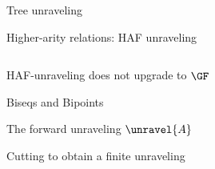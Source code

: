 \documentclass[aspectratio=169]{beamer}
\begin{document}

\begin{frame}{Tree unraveling}
  \begin{center}
    
  \end{center}
\end{frame}


\begin{frame}{Higher-arity relations: HAF unraveling}
  
  

  \begin{columns}
    \begin{column}{0.2\textwidth}
      \begin{overprint}


      \end{overprint}
    \end{column}
    \begin{column}{0.75\textwidth}
      \begin{overprint}
        \exunravelstruct{}


        \exunravelhat{}
      \end{overprint}
    \end{column}
  \end{columns}
\end{frame}

\begin{frame}{HAF-unraveling does not upgrade to $\GF$}
  
\end{frame}

\begin{frame}{Biseqs and Bipoints}
  
\end{frame}

\begin{frame}{The forward unraveling $\unravel{A}$}
  
\end{frame}

\begin{frame}{Cutting to obtain a finite unraveling}
  \begin{center}
    
  \end{center}
\end{frame}
\end{document}
